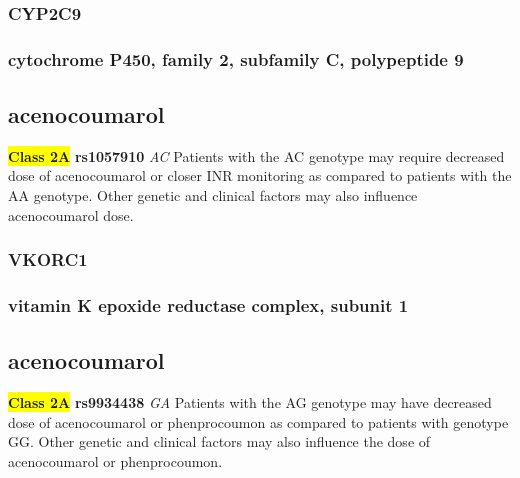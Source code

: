 \documentclass{book}
\begin{document}
\subsubsection{ CYP2C9 }
\subsubsection{ cytochrome P450, family 2, subfamily C, polypeptide 9 }

\subsection{ acenocoumarol }


\begin{center}


\textbf{\colorbox{yellow} {Class 2A}} \textbf{ rs1057910 } \textit{ AC }
Patients with the AC genotype may require decreased dose of acenocoumarol or closer INR monitoring as compared to patients with the AA genotype. Other genetic and clinical factors may also influence acenocoumarol dose.


\end{center}






\subsubsection{ VKORC1 }
\subsubsection{ vitamin K epoxide reductase complex, subunit 1 }

\subsection{ acenocoumarol }


\begin{center}


\textbf{\colorbox{yellow} {Class 2A}} \textbf{ rs9934438 } \textit{ GA }
Patients with the AG genotype may have decreased dose of acenocoumarol or phenprocoumon as compared to patients with genotype GG. Other genetic and clinical factors may also influence the dose of acenocoumarol or phenprocoumon.


\end{center}
\end{document}
